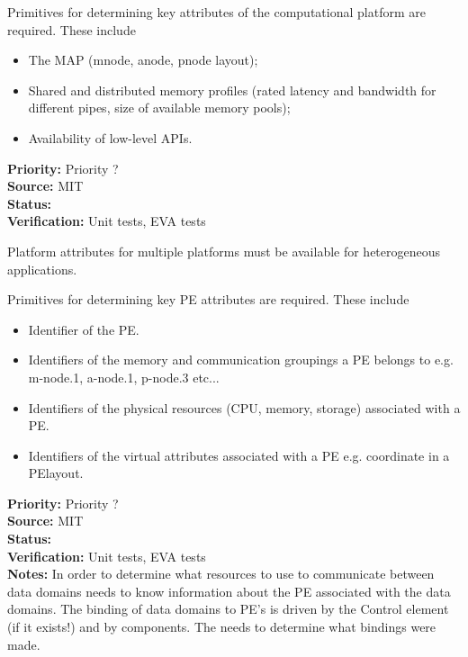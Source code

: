 Primitives for determining key attributes of the computational
platform are required.
These include
\begin{itemize}
\item The MAP (mnode, anode, pnode layout);
\item Shared and distributed memory profiles (rated latency and
  bandwidth for different pipes, size of available memory pools);
\item Availability of low-level APIs.
\end{itemize}

\begin{reqlist}
{\bf Priority:} Priority ? \\
{\bf Source:}  MIT \\
{\bf Status:}  \\
{\bf Verification:} Unit tests, EVA tests \\
\end{reqlist}


Platform attributes for multiple platforms must be available for
heterogeneous applications.


Primitives for determining key PE attributes are required.
These include
\begin{itemize}
\item Identifier of the PE.
\item Identifiers of the memory and communication groupings a PE
belongs to e.g. m-node.1, a-node.1, p-node.3 etc...
\item Identifiers of the physical resources (CPU, memory, storage) associated with a PE.
\item Identifiers of the virtual attributes associated with a PE e.g. coordinate in a PElayout.
\end{itemize}

\begin{reqlist}
{\bf Priority:} Priority ? \\
{\bf Source:}  MIT \\
{\bf Status:}  \\
{\bf Verification:} Unit tests, EVA tests \\
{\bf Notes:}
In order to determine what resources to use to communicate between data domains 
{\bf \shortname} needs to know information about the PE associated with the
data domains. The binding of data domains to PE's is driven by the Control element
(if it exists!) and by components. The {\bf \shortname} needs to determine what
bindings were made.
\end{reqlist}

